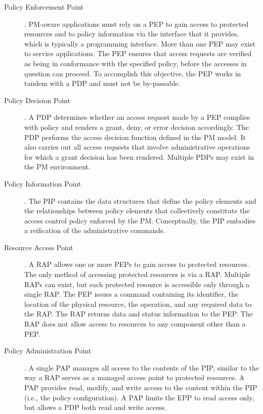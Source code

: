 \documentclass[12pt,a4paper,titlepage]{book}
\begin{document}
	\begin{description}
		
		\item[Policy Enforcement Point]. PM-aware applications must rely on a PEP to gain access to protected resources and to policy information via the interface that it provides, which is typically a programming interface. More than one PEP may exist to service applications. The PEP ensures that access requests are verified as being in conformance with the specified policy, before the accesses in question can proceed. To accomplish this objective, the PEP works in tandem with a PDP and must not be by-passable.
		
		\item[Policy Decision Point]. A PDP determines whether an access request made by a PEP complies with policy and renders a grant, deny, or error decision accordingly. The PDP performs the access decision function defined in the PM model. It also carries out all access requests that involve administrative operations for which a grant decision has been rendered. Multiple PDPs may exist in the PM environment.
		
		\item[Policy Information Point]. The PIP contains the data structures that define the policy elements and the relationships between policy elements that collectively constitute the access control policy enforced by the PM. Conceptually, the PIP embodies a reification of the administrative commands.
		
		\item[Resource Access Point]. A RAP allows one or more PEPs to gain access to protected resources. The only method of accessing protected resources is via a RAP. Multiple RAPs can exist, but each protected resource is accessible only through a single RAP. The PEP issues a command containing its identifier, the location of the physical resource, the operation, and any required data to the RAP. The RAP returns data and status information to the PEP. The RAP does not allow access to resources to any component other than a PEP.

		\item[Policy Administration Point]. A single PAP manages all access to the contents of the PIP, similar to the way a RAP serves as a managed access point to protected resources. A PAP provides read, modify, and write access to the content within the PIP (i.e., the policy configuration). A PAP limits the EPP to read access only, but allows a PDP both read and write access.
		

\end{description}
\end{document}
